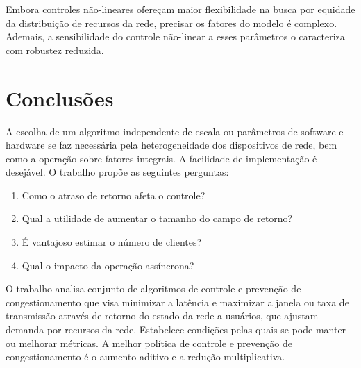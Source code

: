 Embora controles não-lineares ofereçam maior flexibilidade na busca por 
equidade da distribuição de recursos da rede, precisar os fatores do modelo é 
complexo. Ademais, a sensibilidade do controle não-linear a esses parâmetros o 
caracteriza com robustez reduzida.


\section*{Conclusões}

A escolha de um algoritmo independente de escala ou parâmetros de software e 
hardware se faz necessária pela heterogeneidade dos dispositivos de rede, bem 
como a operação sobre fatores integrais. A facilidade de implementação é
desejável. O trabalho propõe as seguintes perguntas:
\begin{enumerate}
  \item Como o atraso de retorno afeta o controle?
  \item Qual a utilidade de aumentar o tamanho do campo de retorno?
  \item É vantajoso estimar o número de clientes?
  \item Qual o impacto da operação assíncrona?
\end{enumerate}

O trabalho analisa conjunto de algoritmos de controle e prevenção de 
congestionamento que visa minimizar a latência e maximizar a janela ou taxa de 
transmissão através de retorno do estado da rede a usuários, que ajustam 
demanda por recursos da rede. Estabelece condições pelas quais se pode manter 
ou melhorar métricas. A melhor política de controle e prevenção de 
congestionamento é o aumento aditivo e a redução multiplicativa.
